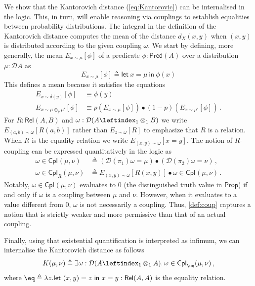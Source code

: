 \documentclass[a4paper,UKenglish,cleveref, autoref, thm-restate]{lipics-v2021}
\newcommand{\pair}[2]{\otimes_{#1,#2}}
\renewcommand{\pair}[2]{\leftindex_{#1}\otimes_{#2}} %
\newcommand{\letIn}[2]{\mathsf{let~} #1 \mathsf{~in~} #2}
\newcommand{\mean}[3]{E_{#1 \sim #2}[#3]}
\newcommand{\Prop}{\mathsf{Prop}}
\newcommand{\ltensor}{*}
\renewcommand{\ltensor}{\bullet}
\newcommand{\TD}{\mathcal{D}}
\newcommand{\kant}[2]{K(#1,#2)}
\newcommand{\coup}[4]{#2 \in \mathsf{Cpl}_{#1}(#3,#4)}
\newcommand{\Rel}[2]{\mathsf{Rel}(#1,#2)}
\newcommand{\Pred}[1]{\mathsf{Pred}(#1)}
\newcommand{\peq}{=}
\newcommand{\jeq}{\equiv}
\newcommand{\defeq}{\triangleq}
\begin{document}
We show that the Kantorovich distance (\ref{eq:Kantorovic}) can be internalised in the logic. 
This, in turn, will enable reasoning via couplings to establish equalities between probability distributions.
The integral in the definition of the Kantorovich distance computes
the mean of the distance $d_X(x,y)$ when $(x,y)$ is distributed according to the given coupling $\omega$. We start by defining, more
generally, the mean $\mean x\mu\phi$ of a predicate $\phi : \Pred A$ over a distribution $\mu:\TD A$ 
as 
\begin{equation} \label{eq:mean:def}
 \mean x\mu\phi \defeq \letIn{x = \mu}{\phi(x)}
\end{equation}
This defines a mean because it satisfies the equations
\begin{align}
  \mean x{\delta(y)}\phi &\jeq \phi(y) 
  \label{eq:mean:dirac} \\
  \mean x{\mu \oplus_p \mu'}\phi &\jeq 
  p (\mean x\mu\phi) \ltensor(1-p) (\mean x{\mu'}\phi) 
  \,. \label{eq:mean:conv}
\end{align}
For $R : \Rel AB$ and $\omega : \TD(A \pair11 B)$ we write $\mean{(a,b)}\omega{R(a,b)}$ rather than 
$\mean{z}\omega{R}$ to emphasize that $R$ is a relation. %
When $R$ is the equality relation we write 
$\mean{(x,y)}\omega{x\peq y}$. 
The notion of $R$-coupling can be expressed quantitatively in the logic as 
\begin{align}
    \label{def:coup}
    \coup{}{\omega}{\mu}{\nu} 
    &\defeq (\TD(\pi_1)\omega \peq \mu) \ltensor  (\TD(\pi_2)\omega \peq \nu) \,,
    \\
    \label{def:R:coup}
    \coup{R}{\omega}\mu\nu 
    &\defeq \mean{(x,y)}\omega{R(x,y)}\ltensor \coup{}{\omega}{\mu}{\nu} \,.
\end{align}
Notably, $\coup{}{\omega}{\mu}{\nu}$ evaluates to $0$ (the distinguished truth value in $\Prop$) if and only if $\omega$ is a coupling between $\mu$ and $\nu$. However, when it evaluates to a value different from $0$, $\omega$ is not necessarily a coupling. Thus, \eqref{def:coup} captures a notion that is strictly weaker and more permissive than that of an actual coupling.

Finally, using that existential quantification is interpreted as infimum, we can internalise the Kantorovich distance as follows
\begin{equation*} \label{eq:internal:Kantorovic}
 \kant\mu \nu 
 \defeq \exists \omega : \TD(A \pair11 A) 
 .\, \coup{\eq}{\omega}{\mu}{\nu} \,,
\end{equation*}
where $\eq \defeq \lambda z. \letIn{(x,y)=z}{x=y} : \Rel AA$ 
is the equality relation.
\end{document}
